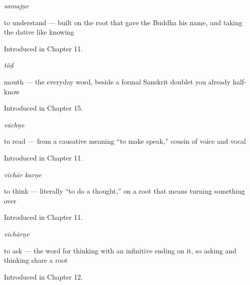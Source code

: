 \noindent\begin{minipage}[t]{\linewidth}
\raggedright
\textbf{}\enspace\emph{samajṇe}\par
\small to understand — built on the root that gave the Buddha his name, and taking the dative like knowing\par
\footnotesize Introduced in Chapter 11.
\end{minipage}\par\medskip

\noindent\begin{minipage}[t]{\linewidth}
\raggedright
\textbf{}\enspace\emph{tõḍ}\par
\small mouth — the everyday word, beside a formal Sanskrit doublet you already half-know\par
\footnotesize Introduced in Chapter 15.
\end{minipage}\par\medskip

\noindent\begin{minipage}[t]{\linewidth}
\raggedright
\textbf{}\enspace\emph{vāchṇe}\par
\small to read — from a causative meaning \textquotedblleft{}to make speak,\textquotedblright{} cousin of voice and vocal\par
\footnotesize Introduced in Chapter 11.
\end{minipage}\par\medskip

\noindent\begin{minipage}[t]{\linewidth}
\raggedright
\textbf{ }\enspace\emph{vichār karṇe}\par
\small to think — literally \textquotedblleft{}to do a thought,\textquotedblright{} on a root that means turning something over\par
\footnotesize Introduced in Chapter 11.
\end{minipage}\par\medskip

\noindent\begin{minipage}[t]{\linewidth}
\raggedright
\textbf{}\enspace\emph{vichārṇe}\par
\small to ask — the word for thinking with an infinitive ending on it, so asking and thinking share a root\par
\footnotesize Introduced in Chapter 12.
\end{minipage}\par\medskip

